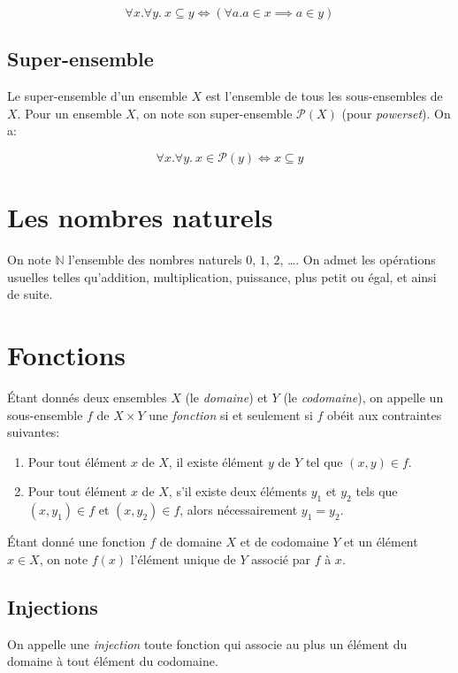 \[
\forall x. \forall y.\ x \subseteq y \iff (\forall a. a \in x \implies a \in y)
\]

\subsection{Super-ensemble}

Le super-ensemble d'un ensemble $X$ est l'ensemble de tous les sous-ensembles de $X$.
Pour un ensemble $X$, on note son super-ensemble $\mathcal{P}(X)$ (pour \textit{powerset}).
On a:

\[
\forall x. \forall y.\ x \in \mathcal{P}(y) \iff x \subseteq y
\]

\section{Les nombres naturels}

On note $\mathbb{N}$ l'ensemble des nombres naturels $0$, $1$, $2$, \dots.
On admet les opérations usuelles telles qu'addition, multiplication, puissance, plus petit ou égal, et ainsi de suite.

\section{Fonctions}

Étant donnés deux ensembles $X$ (le \textit{domaine}) et $Y$ (le \textit{codomaine}), on appelle un sous-ensemble $f$ de $X \times Y$ une \og \textit{fonction} \fg{} si et seulement si $f$ obéit aux contraintes suivantes:
\begin{enumerate}
\item Pour tout élément $x$ de $X$, il existe élément $y$ de $Y$ tel que $(x, y) \in f$.
\item Pour tout élément $x$ de $X$, s'il existe deux éléments $y_1$ et $y_2$ tels que $(x, y_1) \in f$ et $(x, y_2) \in f$, alors nécessairement $y_1 = y_2$.
\end{enumerate}
Étant donné une fonction $f$ de domaine $X$ et de codomaine $Y$ et un élément $x \in X$, on note $f(x)$ l'élément unique de $Y$ associé par $f$ à $x$.

\subsection{Injections}

On appelle une \og \textit{injection} \fg{} toute fonction qui associe au plus un élément du domaine à tout élément du codomaine.

